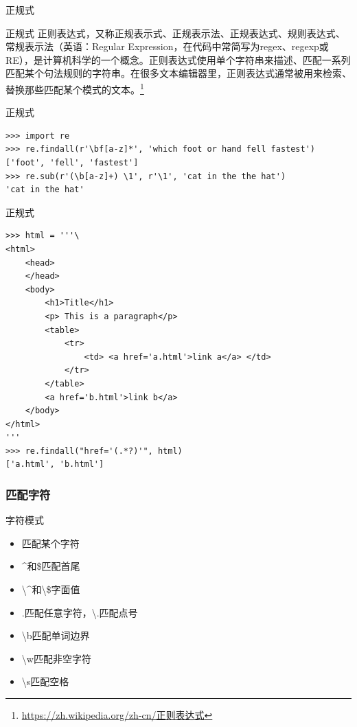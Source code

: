 \documentclass{beamer}
\begin{document}
\begin{frame}[t]{正规式}
    \begin{block}
        {正规式}
        正则表达式，又称正规表示式、正规表示法、正规表达式、规则表达式、常规表示法（英语：Regular Expression，在代码中常简写为regex、regexp或RE），是计算机科学的一个概念。正则表达式使用单个字符串来描述、匹配一系列匹配某个句法规则的字符串。在很多文本编辑器里，正则表达式通常被用来检索、替换那些匹配某个模式的文本。\footnote{\url{https://zh.wikipedia.org/zh-cn/正则表达式}}
    \end{block}
    
\end{frame}
\begin{frame}[t,fragile]{正规式}
	\scriptsize
    \begin{verbatim}
>>> import re
>>> re.findall(r'\bf[a-z]*', 'which foot or hand fell fastest')
['foot', 'fell', 'fastest']
>>> re.sub(r'(\b[a-z]+) \1', r'\1', 'cat in the the hat')
'cat in the hat'
\end{verbatim}
    
\end{frame}
\begin{frame}[t,fragile]{正规式}
	\scriptsize
    \begin{verbatim}
>>> html = '''\
<html>
    <head>
    </head>
    <body>
        <h1>Title</h1>
        <p> This is a paragraph</p>
        <table>
            <tr>
                <td> <a href='a.html'>link a</a> </td>
            </tr>
        </table>
        <a href='b.html'>link b</a>
    </body>
</html>
'''
>>> re.findall("href='(.*?)'", html)
['a.html', 'b.html']
\end{verbatim}
    
\end{frame}
\begin{frame}
  \frametitle{匹配字符}
	\begin{block}
		{字符模式}
		\begin{itemize}
			\item [$\bullet$] [a-zA-Z]匹配某个字符
			\item [$\bullet$] \^{}和\$匹配首尾
			\item [$\bullet$] \textbackslash \^{}和\textbackslash \$字面值
			\item [$\bullet$] .匹配任意字符，\textbackslash .匹配点号
			\item [$\bullet$] \textbackslash b匹配单词边界
			\item [$\bullet$] \textbackslash w匹配非空字符
			\item [$\bullet$] \textbackslash s匹配空格
		\end{itemize}
	\end{block}
\end{frame}
\end{document}
